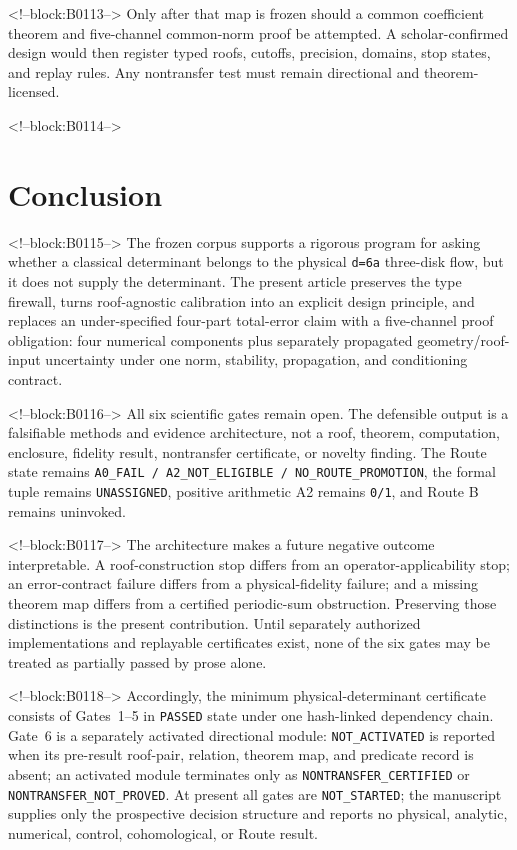 \documentclass[11pt,a4paper]{article}
\begin{document}
<!--block:B0113-->
Only after that map is frozen should a common coefficient theorem and five-channel common-norm proof be attempted. A scholar-confirmed design would then register typed roofs, cutoffs, precision, domains, stop states, and replay rules. Any nontransfer test must remain directional and theorem-licensed.

<!--block:B0114-->
\section{Conclusion}

<!--block:B0115-->
The frozen corpus supports a rigorous program for asking whether a classical determinant belongs to the physical \texttt{d=6a} three-disk flow, but it does not supply the determinant. The present article preserves the type firewall, turns roof-agnostic calibration into an explicit design principle, and replaces an under-specified four-part total-error claim with a five-channel proof obligation: four numerical components plus separately propagated geometry/roof-input uncertainty under one norm, stability, propagation, and conditioning contract.

<!--block:B0116-->
All six scientific gates remain open. The defensible output is a falsifiable methods and evidence architecture, not a roof, theorem, computation, enclosure, fidelity result, nontransfer certificate, or novelty finding. The Route state remains \texttt{A0\_FAIL\ /\ A2\_NOT\_ELIGIBLE\ /\ NO\_ROUTE\_PROMOTION}, the formal tuple remains \texttt{UNASSIGNED}, positive arithmetic A2 remains \texttt{0/1}, and Route B remains uninvoked.

<!--block:B0117-->
The architecture makes a future negative outcome interpretable. A roof-construction stop differs from an operator-applicability stop; an error-contract failure differs from a physical-fidelity failure; and a missing theorem map differs from a certified periodic-sum obstruction. Preserving those distinctions is the present contribution. Until separately authorized implementations and replayable certificates exist, none of the six gates may be treated as partially passed by prose alone.

<!--block:B0118-->
Accordingly, the minimum physical-determinant certificate consists of Gates~1--5 in \texttt{PASSED} state under one hash-linked dependency chain. Gate~6 is a separately activated directional module: \texttt{NOT\_ACTIVATED} is reported when its pre-result roof-pair, relation, theorem map, and predicate record is absent; an activated module terminates only as \texttt{NONTRANSFER\_CERTIFIED} or \texttt{NONTRANSFER\_NOT\_PROVED}. At present all gates are \texttt{NOT\_STARTED}; the manuscript supplies only the prospective decision structure and reports no physical, analytic, numerical, control, cohomological, or Route result.
\end{document}
